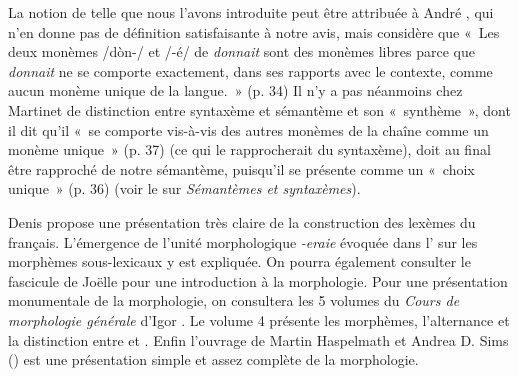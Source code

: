{    La notion de  telle que nous l’avons introduite peut être attribuée à André \citet{martinet1985syntaxe}, qui n’en donne pas de définition satisfaisante à notre avis, mais considère que «~Les deux monèmes /dòn-/ et /-é/ de \textit{donnait} sont des monèmes libres parce que \textit{donnait} ne se comporte exactement, dans ses rapports avec le contexte, comme aucun monème unique de la langue.~» (p. 34) Il n’y a pas néanmoins chez Martinet de distinction entre syntaxème et sémantème et son «~synthème~», dont il dit qu’il «~se comporte vis-à-vis des autres monèmes de la chaîne comme un monème unique~» (p. 37) (ce qui le rapprocherait du syntaxème), doit au final être rapproché de notre sémantème, puisqu’il se présente comme un «~choix unique~» (p. 36) (voir le  sur \textit{Sémantèmes et syntaxèmes}).

    Denis \citet{apotheloz2002construction} propose une présentation très claire de la construction des lexèmes du français. L’émergence de l'unité morphologique \textit{{}-eraie} évoquée dans l' sur les morphèmes sous-lexicaux y est expliquée. On pourra également consulter le fascicule de Joëlle \citet{gardes-tamine1990grammaire} pour une introduction à la morphologie. Pour une présentation monumentale de la morphologie, on consultera les 5 volumes du \textit{Cours de morphologie générale} d’Igor \citet{melcuk1993cours}. Le volume 4 présente les morphèmes, l’alternance et la distinction entre  et . Enfin l'ouvrage de Martin Haspelmath et Andrea D. Sims (\citeyear{haspelmath2013understanding}) est une présentation simple et assez complète de la morphologie.

}
